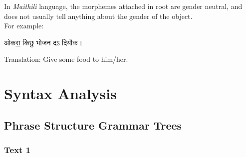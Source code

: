 \documentclass[17pt]{extarticle}
\begin{document}
In \emph{Maithili} language, the morphemes attached in root are gender neutral, and does not usually tell anything about the gender of the object.\\

For example: \begin{hindi}
    ओक\underline{रा} किछु भोजन दऽ दियौक।
\end{hindi}

Translation: Give some food to him/her.

\section*{\textbf{Syntax Analysis}}

\subsection*{\textbf{Phrase Structure Grammar Trees}}

\subsubsection*{Text 1}
\end{document}
